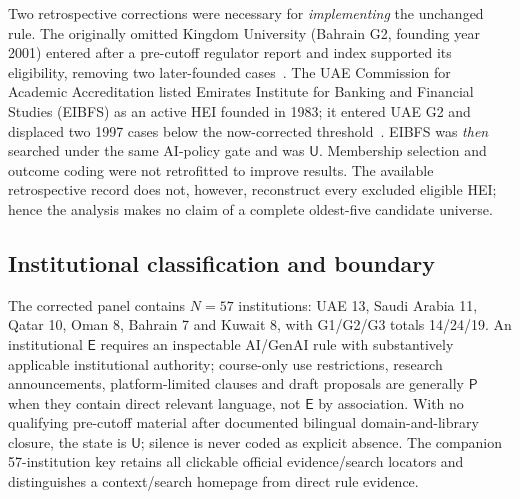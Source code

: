 \documentclass[conference,letterpaper]{IEEEtran}
\newcommand{\stE}{\textsf{E}}
\newcommand{\stP}{\textsf{P}}
\newcommand{\stU}{\textsf{U}}
\begin{document}
Two retrospective corrections were necessary for \emph{implementing} the unchanged rule. The originally omitted Kingdom University (Bahrain G2, founding year 2001) entered after a pre-cutoff regulator report and index supported its eligibility, removing two later-founded cases~\cite{bqa1,bqa2}. The UAE Commission for Academic Accreditation listed Emirates Institute for Banking and Financial Studies (EIBFS) as an active HEI founded in 1983; it entered UAE G2 and displaced two 1997 cases below the now-corrected threshold~\cite{caa1,caa2}. EIBFS was \emph{then} searched under the same AI-policy gate and was $\stU$. Membership selection and outcome coding were not retrofitted to improve results. The available retrospective record does not, however, reconstruct every excluded eligible HEI; hence the analysis makes no claim of a complete oldest-five candidate universe.

\subsection{Institutional classification and boundary}
The corrected panel contains $N=57$ institutions: UAE 13, Saudi Arabia 11, Qatar 10, Oman 8, Bahrain 7 and Kuwait 8, with G1/G2/G3 totals 14/24/19. An institutional $\stE$ requires an inspectable AI/GenAI rule with substantively applicable institutional authority; course-only use restrictions, research announcements, platform-limited clauses and draft proposals are generally $\stP$ when they contain direct relevant language, not $\stE$ by association. With no qualifying pre-cutoff material after documented bilingual domain-and-library closure, the state is $\stU$; silence is never coded as explicit absence. The companion 57-institution key retains all clickable official evidence/search locators and distinguishes a context/search homepage from direct rule evidence.
\end{document}
